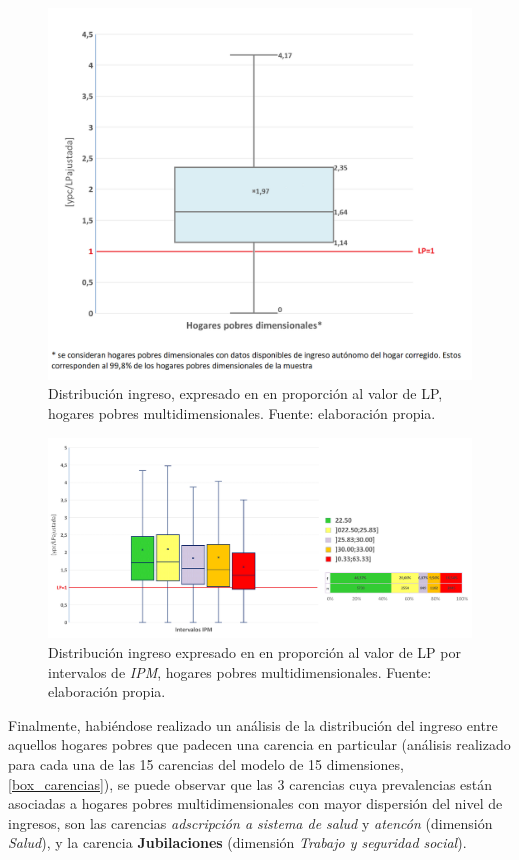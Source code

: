 \documentclass[12pt,letterpaper,spanish]{article}
\begin{document}
\begin{figure}[!]
    \centering
    \includegraphics[height=10 cm]{Max/box_general.png}
    \caption{Distribución ingreso, expresado en en proporción al valor de LP, hogares pobres multidimensionales. Fuente: elaboración propia.}
    \label{box_general}
\end{figure}


\begin{figure}[!]
    \centering
    \includegraphics[width=\textwidth]{Max/box_deciles2.png}
    \caption{Distribución ingreso expresado en en proporción al valor de LP por intervalos de \textit{IPM}, hogares pobres multidimensionales. Fuente: elaboración propia.}
    \label{box_deciles}
\end{figure}



Finalmente, habiéndose realizado un análisis de la distribución del ingreso entre aquellos hogares pobres que padecen una carencia en particular (análisis realizado para cada una de las 15 carencias del modelo de 15 dimensiones, \ref{box_carencias}), se puede observar que las 3 carencias cuya prevalencias están asociadas a hogares pobres multidimensionales con mayor dispersión del nivel de ingresos, son las carencias \textit{adscripción a sistema de salud} y \textit{atencón} (dimensión \textit{Salud}), y la carencia \textbf{Jubilaciones} (dimensión \textit{Trabajo y seguridad social}).
\end{document}
